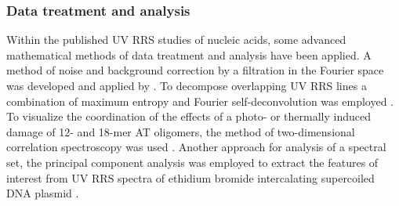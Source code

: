 \subsubsection{Data treatment and analysis}

Within the published UV RRS studies of nucleic acids, some advanced
mathematical methods of data treatment and analysis have been applied.
A method of noise and background correction by a filtration in the Fourier
space was developed and applied by
\textcite{Laigle1982}.
To decompose overlapping UV RRS lines a combination of maximum entropy and
Fourier self-deconvolution was employed
\parencite{Efremov1991}.
To visualize the coordination of the effects of a photo- or thermally induced
damage of 12- and 18-mer AT oligomers, the method of two-dimensional
correlation spectroscopy was used
\parencite{Jirasek2006}.
Another approach for analysis of a spectral set, the principal component
analysis was employed to extract the features of interest from UV RRS spectra
of ethidium bromide intercalating supercoiled DNA plasmid
\parencite{Neugebauer2007}.
